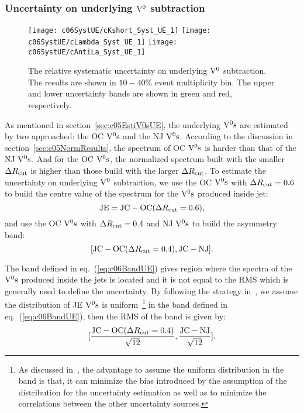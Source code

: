 \subsubsection{Uncertainty on underlying ${\rm V}^{0}$ subtraction}

\begin{figure}[htb]
\begin{center}
\texttt{[image: c06SystUE/cKshort\_Syst\_UE\_1]}
\texttt{[image: c06SystUE/cLambda\_Syst\_UE\_1]}
\texttt{[image: c06SystUE/cAntiLa\_Syst\_UE\_1]}
\caption{The relative systematic uncertainty on underlying ${\rm V}^{0}$ subtraction.
The results are shown in $10-40\%$ event multiplicity bin.
The upper and lower uncertainty bands are shown in green and red, respectively.}
\label{fig:c06SystUE}
\end{center}
\end{figure}

As mentioned in section~\ref{sec:c05EstiV0sUE},
the underlying ${\rm V}^{0}{\rm s}$ are estimated by two approached:
the OC ${\rm V}^{0}{\rm s}$ and the NJ ${\rm V}^{0}{\rm s}$.
According to the discussion in section~\ref{sec:c05NormResults},
the spectrum of OC ${\rm V}^{0}{\rm s}$ is harder than that of the NJ ${\rm V}^{0}{\rm s}$.
And for the OC ${\rm V}^{0}{\rm s}$, the normalized spectrum built with the
smaller $\Delta R_{\rm cut}$ is higher than those build with the
larger $\Delta R_{\rm cut}$.
To estimate the uncertainty on underlying ${\rm V}^{0}$ subtraction,
we use the OC ${\rm V}^{0}{\rm s}$ with $\Delta R_{\rm cut}=0.6$ to build the
centre value of the spectrum for the ${\rm V}^{0}{\rm s}$ produced inside jet:
\begin{equation}
{\rm JE}={\rm JC}-{\rm OC}(\Delta R_{\rm cut}=0.6),
\end{equation}
 and use the OC ${\rm V}^{0}{\rm s}$ with $\Delta R_{\rm cut}=0.4$ and
NJ ${\rm V}^{0}{\rm s}$ to build the asymmetry band:
\begin{equation}\label{eq:c06BandUE}
[{\rm JC}-{\rm OC}(\Delta R_{\rm cut}=0.4), {\rm JC}-{\rm NJ}].
\end{equation}

The band defined in eq.~(\ref{eq:c06BandUE}) gives region where the spectra
of the ${\rm V}^{0}{\rm s}$ produced inside the jets is located and it is not equal to
the RMS which is generally used to define the uncertainty.
By following the strategy in~\cite{Ali2013:ana921},
we assume the distribution of JE ${\rm V}^{0}{\rm s}$ is uniform~\footnote{As discussed
in~\cite{Ali2013:ana921}, the advantage to assume the uniform distribution
in the band is that,
it can minimize the bias introduced by the assumption of the distribution
for the uncertainty estimation as well as to minimize the correlations
between the other uncertainty sources.}
in the band defined
in eq.~(\ref{eq:c06BandUE}), then the RMS of the band is given by:
\begin{equation}\label{eq:c06UEbandRMS}
[\frac{{\rm JC}-{\rm OC}(\Delta R_{\rm cut}=0.4)}{\sqrt{12}},
\frac{{\rm JC}-{\rm NJ}}{\sqrt{12}}].
\end{equation}

